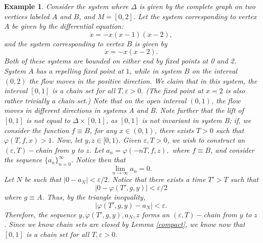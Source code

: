 \documentclass[11pt]{article}
\newtheorem{ex}[thm]{Example}
\begin{document}
\begin{ex}
Consider the system where $\Delta$ is given by the complete graph on two vertices labeled $A$ and $B$, and $M=[0,2]$.  Let the system corresponding to vertex $A$ be given by the differential equation:
$$\dot{x}=-x(x-1)(x-2),$$
and the system corresponding to vertex $B$ is given by 
$$\dot{x}=-x(x-2).$$
Both of these systems are bounded on either end by fixed points at 0 and 2.  System $A$ has a repelling fixed point at $1$, while in system $B$ on the interval $(0,2)$ the flow moves in the positive direction.  We claim that in this system, the interval $[0,1]$ is a chain set for all $T, \varepsilon>0$.  (The fixed point at $x=2$ is also rather trivially a chain set.) Note that on the open interval $(0,1)$, the flow moves in different directions in systems A and B.  Note further that the lift of $[0,1]$ is not equal to $\Delta\times [0,1]$, as $[0,1]$ is not invariant in system B; if, we consider the function $f\equiv B$, for any $x\in (0,1)$, there exists $T>0$ such that $\varphi(T,f,x)>1$.  Now, let $y,z\in [0,1)$.  Given $\varepsilon,T>0$, we wish to construct an $(\varepsilon,T)-$chain from $y$ to $z$.  Let $a_n=\varphi(-nT,f,z),$ where $f\equiv B$, and consider the sequence $\{a_n\}_{n=0}^\infty$. Notice then that 
$$\lim_{n\rightarrow\infty}a_n=0.$$
Let $N$ be such that $|0-a_N|<\varepsilon/2$. Notice that there exists a time $T'>T$ such that $$|0-\varphi(T',g,y)|<\varepsilon/2$$
where $g\equiv A$. Thus, by the triangle inequality, 
$$|\varphi(T',g,y)-a_N|<\varepsilon.$$
Therefore, the sequence $y, \varphi(T',g,y),a_N,z$ forms an $(\varepsilon,T)-$chain from $y$ to $z$.  Since we know chain sets are closed by Lemma \ref{compact}, we know now that $[0,1]$ is a chain set for all $T,\varepsilon>0$. \\

\end{ex}
\end{document}
